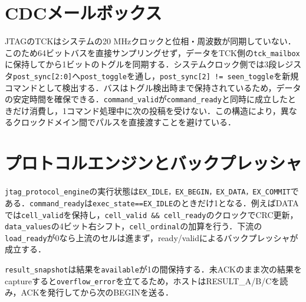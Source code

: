 \section{CDCメールボックス}
JTAGのTCKはシステムの20 MHzクロックと位相・周波数が同期していない．このため64ビットバスを直接サンプリングせず，データをTCK側の\texttt{tck\_mailbox}に保持してから1ビットのトグルを同期する．システムクロック側では3段レジスタ\texttt{post\_sync[2:0]}へ\texttt{post\_toggle}を通し，\texttt{post\_sync[2] != seen\_toggle}を新規コマンドとして検出する．バスはトグル検出時まで保持されているため，データの安定時間を確保できる．\texttt{command\_valid}が\texttt{command\_ready}と同時に成立したときだけ消費し，1コマンド処理中に次の投稿を受けない．この構造により，異なるクロックドメイン間でパルスを直接渡すことを避けている．

\section{プロトコルエンジンとバックプレッシャ}
\texttt{jtag\_protocol\_engine}の実行状態は\texttt{EX\_IDLE，EX\_BEGIN，EX\_DATA，EX\_COMMIT}である．\texttt{command\_ready}は\texttt{exec\_state==EX\_IDLE}のときだけ1となる．例えばDATAでは\texttt{cell\_valid}を保持し，\texttt{cell\_valid \&\& cell\_ready}のクロックでCRC更新，\texttt{data\_values}の4ビット右シフト，\texttt{cell\_ordinal}の加算を行う．下流の\texttt{load\_ready}が0なら上流のセルは進まず，ready/validによるバックプレッシャが成立する．

\texttt{result\_snapshot}は結果を\texttt{available}が1の間保持する．未ACKのまま次の結果をcaptureすると\texttt{overflow\_error}を立てるため，ホストはRESULT\_A/B/Cを読み，ACKを発行してから次のBEGINを送る．

